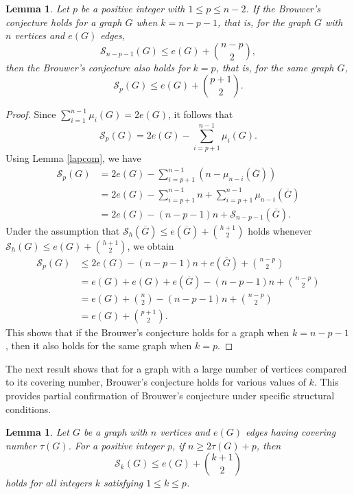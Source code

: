 \documentclass[12pt]{article}
\theoremstyle{plain}
\newtheorem{lemma}[theorem]{Lemma}
\theoremstyle{definition}
\begin{document}
\begin{lemma} \label{revchen} 
Let $p$ be a positive integer with $1\leq p\leq n-2$. If the Brouwer's conjecture holds for a graph $G$ when $k=n-p-1$, that is, for the graph $G$ with $n$ vertices and $e(G)$ edges,
\begin{equation*}\label{an-p-1}
\mathcal{S}_{n-p-1}(G)\leq e(G)+\binom{n-p}{2}, 
\end{equation*}
then the Brouwer's conjecture also holds for $k=p$, that is, for the same graph $G$,
\begin{equation*}\label{p} 	
\mathcal{S}_{p}(G) \leq e(G)+\binom{p + 1}{2}.
\end{equation*}
\end{lemma}
\begin{proof}
Since $\sum_{i=1}^{n-1}\mu_i(G)=2 e(G)$, it follows that
$$\mathcal{S}_{p}(G)=2 e(G)-\sum_{i=p+1}^{n-1} \mu_i(G).$$
Using Lemma \ref{lapcom}, we have 
\begin{align*}
\mathcal{S}_{p}(G)
& =2 e(G)-\sum_{i=p+1}^{n-1}\left(n-\mu_{n-i}(\overline{G})\right) \quad \\
&=2e(G)-\sum_{i=p+1}^{n-1}n+\sum_{i=p+1}^{n-1}\mu_{n-i}(\overline{G})\\
&= 2e(G)-(n-p-1)n+\mathcal{S}_{n-p-1}(\overline{G}).
\end{align*}
Under the assumption that $\mathcal{S}_h(\overline{G})\leq e(\overline{G})+\binom{h+1}{2}$ holds whenever $\mathcal{S}_h(G)\leq e(G)+\binom{h+1}{2}$, we obtain
\begin{align*}
\mathcal{S}_{p}(G)
& \leq 2 e(G)-(n-p-1) n+e(\overline{G})+\binom{n-p}{2} \\
&= e(G)+e(G)+e(\overline{G})-(n-p-1) n+\binom{n-p}{2}  \\
& =e(G)+\binom{n}{2}-(n-p-1) n+\binom{n-p}{2} \\
& =e(G)+\binom{p+1}{2}.
\end{align*}
This shows that if the Brouwer's conjecture holds for a graph when $k=n-p-1$, then it also holds for the same graph when $k=p$. 
\end{proof}
The next result shows that for a graph with a large number of vertices compared to its covering number, Brouwer's conjecture holds for various values of $k$. This provides partial confirmation of Brouwer's conjecture under specific structural conditions.
\begin{lemma}\label{brotau} Let $G$ be a graph with $n$ vertices and $e(G)$ edges having covering number $\tau(G)$. For a positive integer $p$, if $n\geq 2\tau(G)+p$, then $$\mathcal{S}_k(G)\leq e(G)+\binom{k+1}{2}$$ holds for all integers $k$ satisfying $1\leq k\leq p$.
\end{lemma}
\end{document}
